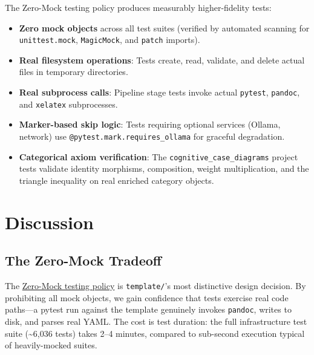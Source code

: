 \documentclass[
]{article}
\providecommand{\tightlist}{%
  \setlength{\itemsep}{0pt}\setlength{\parskip}{0pt}}
\begin{document}
The Zero-Mock testing policy produces measurably higher-fidelity tests:

\begin{itemize}
\tightlist
\item
  \textbf{Zero mock objects} across all test suites (verified by
  automated scanning for \texttt{unittest.mock}, \texttt{MagicMock}, and
  \texttt{patch} imports).
\item
  \textbf{Real filesystem operations}: Tests create, read, validate, and
  delete actual files in temporary directories.
\item
  \textbf{Real subprocess calls}: Pipeline stage tests invoke actual
  \texttt{pytest}, \texttt{pandoc}, and \texttt{xelatex} subprocesses.
\item
  \textbf{Marker-based skip logic}: Tests requiring optional services
  (Ollama, network) use \texttt{@pytest.mark.requires\_ollama} for
  graceful degradation.
\item
  \textbf{Categorical axiom verification}: The
  \texttt{cognitive\_case\_diagrams} project tests validate identity
  morphisms, composition, weight multiplication, and the triangle
  inequality on real enriched category objects.
\end{itemize}

\newpage

\section{Discussion}\label{discussion}

\subsection{The Zero-Mock Tradeoff}\label{the-zero-mock-tradeoff}

The \href{03e_quality.md\#zero-mock-testing-policy}{Zero-Mock testing
policy} is \texttt{template/}'s most distinctive design decision. By
prohibiting all mock objects, we gain confidence that tests exercise
real code paths---a pytest run against the template genuinely invokes
\texttt{pandoc}, writes to disk, and parses real YAML. The cost is test
duration: the full infrastructure test suite (\textasciitilde6,036
tests) takes 2--4 minutes, compared to sub-second execution typical of
heavily-mocked suites.
\end{document}
